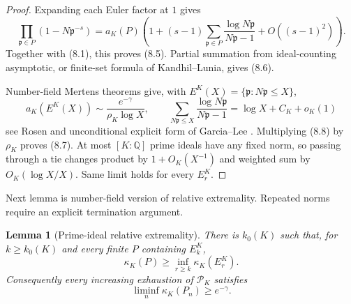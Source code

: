 \documentclass[11pt]{article}
\newtheorem{lemma}[theorem]{Lemma}
\theoremstyle{definition}
\theoremstyle{remark}
\begin{document}
\begin{proof}
Expanding each Euler factor at $1$ gives
\[
 \prod_{\mathfrak p\in P}(1-N\mathfrak p^{-s})
 =a_K(P)\left(1+(s-1)\sum_{\mathfrak p\in P}
 \frac{\log N\mathfrak p}{N\mathfrak p-1}+O((s-1)^2)\right).
\]
Together with (8.1), this proves (8.5).  Partial summation from ideal-counting asymptotic, or
finite-set formula of Kandhil--Lunia, gives (8.6).

Number-field Mertens theorems give, with $E^K(X)=\{\mathfrak p:N\mathfrak p\leq X\}$,
\begin{equation}
 a_K(E^K(X))\sim\frac{e^{-\gamma}}{\rho_K\log X},\qquad
 \sum_{N\mathfrak p\leq X}\frac{\log N\mathfrak p}{N\mathfrak p-1}
 =\log X+C_K+o_K(1)                                     \tag{8.8}
\end{equation}
see Rosen and unconditional explicit form of Garcia--Lee
\cite{Rosen1999,GarciaLee2022}.  Multiplying (8.8) by $\rho_K$ proves (8.7).  At most
$[K:\mathbb Q]$ prime ideals have any fixed norm, so passing through a tie changes product by
$1+O_K(X^{-1})$ and weighted sum by $O_K(\log X/X)$.  Same limit holds for every $E_r^K$.
\end{proof}

Next lemma is number-field version of relative extremality.  Repeated norms require an explicit
termination argument.

\begin{lemma}[Prime-ideal relative extremality]
\label{lem:K-extremal}
There is $k_0(K)$ such that, for $k\geq k_0(K)$ and every finite $P$ containing $E_k^K$,
\begin{equation}
 \kappa_K(P)\geq\inf_{r\geq k}\kappa_K(E_r^K).          \tag{8.9}
\end{equation}
Consequently every increasing exhaustion of $\mathcal P_K$ satisfies
\begin{equation}
 \liminf_n\kappa_K(P_n)\geq e^{-\gamma}.               \tag{8.10}
\end{equation}
\end{lemma}
\end{document}
